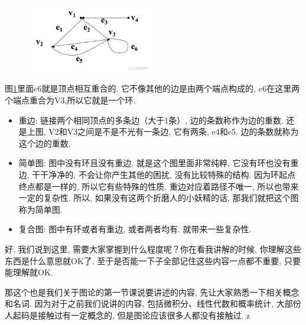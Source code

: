 \begin{figure}[ht]
  \centering
  \includegraphics[width=0.5\textwidth]{asset/20231227144939.png}
  \caption{}
  \label{fig:img24_8}
\end{figure}

图\ref{fig:img24_8}里面$e6$就是顶点相互重合的. 它不像其他的边是由两个端点构成的, $e6$在这里两个端点重合为V3,所以它就是一个环. 

\begin{itemize}
  \item 重边: 链接两个相同顶点的多条边（大于1条）, 边的条数称作为边的重数. 还是上图, V2和V3之间是不是不光有一条边, 它有两条, e4和e5. 边的条数就称为这个边的重数. 
  \item 简单图: 图中没有环且没有重边. 就是这个图里面非常纯粹, 它没有环也没有重边, 干干净净的, 不会让你产生其他的困扰, 没有比较特殊的结构. 因为环起点终点都是一样的, 所以它有些特殊的性质. 重边对应着路径不唯一, 所以也带来一定的复杂性. 所以, 如果没有这两个折磨人的小妖精的话, 那我们就把这个图称为简单图. 
  \item 复合图: 图中有环或者有重边, 或者两者均有. 就带来一些复杂性. 
\end{itemize}

好, 我们说到这里, 需要大家掌握到什么程度呢？你在看我讲解的时候, 你理解这些东西是什么意思就OK了. 至于是否能一下子全部记住这些内容一点都不重要, 只要能理解就OK. 

那这个也是我们关于图论的第一节课说要讲述的内容, 先让大家熟悉一下相关概念和名词. 因为对于之前我们说讲的内容, 包括微积分、线性代数和概率统计, 大部份人起码是接触过有一定概念的, 但是图论应该很多人都没有接触过. z